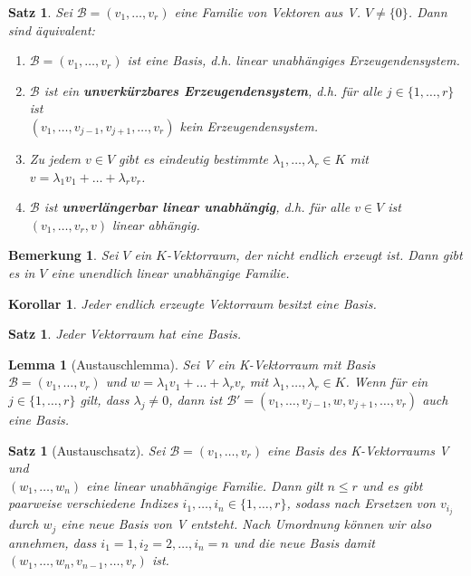 \documentclass[12pt,a4paper]{article}
\theoremstyle{plain}
\newtheorem{Satz}[Theorem]{Satz}
\newtheorem{Lemma}[Theorem]{Lemma}
\newtheorem{Korollar}[Theorem]{Korollar}
\newtheorem{Bemerkung}[Theorem]{Bemerkung}
\newcommand{\herv}[1]{{\emph{\textbf{#1}}}}
\numberwithin{equation}{section}
\begin{document}
\begin{Satz}
Sei $\mathcal{B}=(v_1,\ldots,v_r)$ eine Familie von Vektoren aus V. $V\neq \{0\}$. Dann sind äquivalent:
\begin{enumerate}
\renewcommand{\labelenumi}{\emph{(\roman{enumi})}}
\item $\mathcal{B}=(v_1,\ldots,v_r)$ ist eine Basis, d.h. linear unabhängiges Erzeugendensystem.
\item $\mathcal{B}$ ist ein \herv{unverkürzbares Erzeugendensystem}, d.h. für alle $j\in \{1,\ldots,r\}$ ist \\ $(v_1,\ldots,v_{j-1},v_{j+1},\ldots,v_r)$ kein Erzeugendensystem.
\item Zu jedem $v\in V$ gibt es eindeutig bestimmte $\lambda_1,\ldots,\lambda_r\in K$ mit $v=\lambda_1 v_1+\ldots+\lambda_r v_r$.
\item $\mathcal{B}$ ist \herv{unverlängerbar linear unabhängig}, d.h. für alle $v\in V$ ist $(v_1,\ldots,v_r,v)$ linear abhängig. 
\end{enumerate}
\end{Satz}
\begin{Bemerkung}
Sei $V$ ein $K$-Vektorraum, der nicht endlich erzeugt ist. Dann gibt es in $V$ eine unendlich linear unabhängige Familie.
\end{Bemerkung}
\begin{Korollar}
Jeder endlich erzeugte Vektorraum besitzt eine Basis.
\end{Korollar}
\begin{Satz}
Jeder Vektorraum hat eine Basis.
\end{Satz}
\begin{Lemma}[Austauschlemma]
Sei V ein K-Vektorraum mit Basis $\mathcal{B}=(v_1,\ldots,v_r)$ und $w=\lambda_1 v_1+\ldots+\lambda_r v_r$ mit $\lambda_1,\ldots,\lambda_r\in K$. Wenn für ein $j\in\{1,\ldots,r\}$ gilt, dass $\lambda_j\neq 0$, dann ist $\mathcal{B}'=(v_1,\ldots,v_{j-1},w,v_{j+1},\ldots,v_r)$ auch eine Basis.
\end{Lemma}
\begin{Satz}[Austauschsatz]
Sei $\mathcal{B}=(v_1,\ldots,v_r)$ eine Basis des K-Vektorraums V und \\$(w_1,\ldots,w_n)$ eine linear unabhängige Familie. Dann gilt $n\leq r$ und es gibt paarweise verschiedene Indizes $i_1,\ldots,i_n\in \{1,\ldots,r\}$, sodass nach Ersetzen von $v_{i_j}$ durch $w_j$ eine neue Basis von V entsteht. Nach Umordnung können wir also annehmen, dass $i_1=1,i_2=2,\ldots,i_n=n$ und die neue  Basis damit $(w_1,\ldots,w_n,v_{n-1},\ldots,v_r)$ ist.
\end{Satz}
\end{document}
